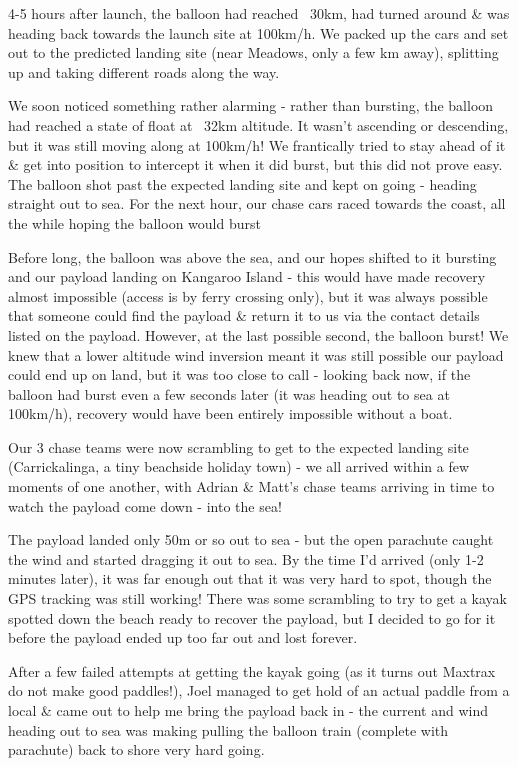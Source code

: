 \documentclass[a4paper,12pt]{article}
\begin{document}
\begin{appendices}
4-5 hours after launch, the balloon had reached ~30km, had turned around \& was heading back towards the launch site at 100km/h. We packed up the cars and set out to the predicted landing site (near Meadows, only a few km away), splitting up and taking different roads along the way.

We soon noticed something rather alarming - rather than bursting, the balloon had reached a state of float at ~32km altitude. It wasn't ascending or descending, but it was still moving along at 100km/h! We frantically tried to stay ahead of it \& get into position to intercept it when it did burst, but this did not prove easy. The balloon shot past the expected landing site and kept on going - heading straight out to sea. For the next hour, our chase cars raced towards the coast, all the while hoping the balloon would burst

Before long, the balloon was above the sea, and our hopes shifted to it bursting and our payload landing on Kangaroo Island - this would have made recovery almost impossible (access is by ferry crossing only), but it was always possible that someone could find the payload \& return it to us via the contact details listed on the payload. However, at the last possible second, the balloon burst! We knew that a lower altitude wind inversion meant it was still possible our payload could end up on land, but it was too close to call - looking back now, if the balloon had burst even a few seconds later (it was heading out to sea at 100km/h), recovery would have been entirely impossible without a boat.

Our 3 chase teams were now scrambling to get to the expected landing site (Carrickalinga, a tiny beachside holiday town) - we all arrived within a few moments of one another, with Adrian \& Matt's chase teams arriving in time to watch the payload come down - into the sea!

The payload landed only 50m or so out to sea - but the open parachute caught the wind and started dragging it out to sea. By the time I'd arrived (only 1-2 minutes later), it was far enough out that it was very hard to spot, though the GPS tracking was still working! There was some scrambling to try to get a kayak spotted down the beach ready to recover the payload, but I decided to go for it before the payload ended up too far out and lost forever.

After a few failed attempts at getting the kayak going (as it turns out Maxtrax do not make good paddles!), Joel managed to get hold of an actual paddle from a local \& came out to help me bring the payload back in - the current and wind heading out to sea was making pulling the balloon train (complete with parachute) back to shore very hard going.


\end{appendices}
\end{document}
